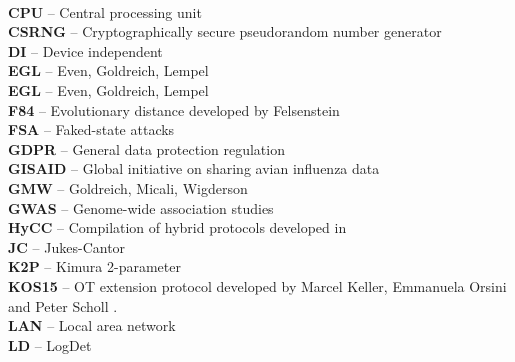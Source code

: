 \vspace{0.5cm}\\
\textbf{CPU} -- Central processing unit
\vspace{0.5cm}\\
\textbf{CSRNG} -- Cryptographically secure pseudorandom number generator
\vspace{0.5cm}\\
\textbf{DI} -- Device independent
\vspace{0.5cm}\\
\textbf{EGL} -- Even, Goldreich, Lempel
\vspace{0.5cm}\\
\textbf{EGL} -- Even, Goldreich, Lempel
\vspace{0.5cm}\\
\textbf{F84} -- Evolutionary distance developed by Felsenstein
\vspace{0.5cm}\\
\textbf{FSA} -- Faked-state attacks
\vspace{0.5cm}\\
\textbf{GDPR} -- General data protection regulation
\vspace{0.5cm}\\
\textbf{GISAID} -- Global initiative on sharing avian influenza data
\vspace{0.5cm}\\
\textbf{GMW} -- Goldreich, Micali, Wigderson
\vspace{0.5cm}\\
\textbf{GWAS} -- Genome-wide association studies
\vspace{0.5cm}\\
\textbf{HyCC} -- Compilation of hybrid protocols developed in \cite{Bscher2018}
\vspace{0.5cm}\\
\textbf{JC} -- Jukes-Cantor
\vspace{0.5cm}\\
\textbf{K2P} -- Kimura 2-parameter
\vspace{0.5cm}\\
\textbf{KOS15} -- OT extension protocol developed by Marcel Keller, Emmanuela Orsini and Peter Scholl \cite{KOS15}.
\vspace{0.5cm}\\
\textbf{LAN} -- Local area network
\vspace{0.5cm}\\
\textbf{LD} -- LogDet
\vspace{0.5cm}\\
